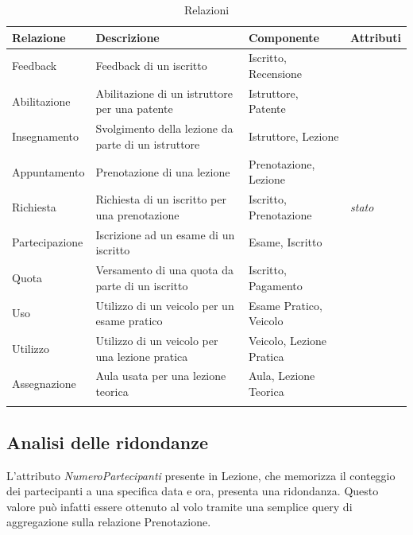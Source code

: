 \documentclass[10pt,twoside]{article}
\begin{document}
{    \begin{longtable}[H]{|>{\centering\arraybackslash}p{3cm}|
                            >{\centering\arraybackslash}p{3cm}|
                            >{\centering\arraybackslash}p{4.85cm}|
                            >{\centering\arraybackslash}p{3cm}|}
            \hline
            \rowcolor{lightgray!40}
            \textbf{Relazione} & \textbf{Descrizione} & \textbf{Componente} & \textbf{Attributi} \\
            \hline
            \rowcolor{white!40}
            Feedback & Feedback di un iscritto & Iscritto, Recensione & \\
            \hline
            \rowcolor{white!40}
            Abilitazione & Abilitazione di un istruttore per una patente & Istruttore, Patente & \\
            \hline
            \rowcolor{white!40}
            Insegnamento & Svolgimento della lezione da parte di un istruttore & Istruttore, Lezione & \\
            \hline
            \rowcolor{white!40}
            Appuntamento & Prenotazione di una lezione & Prenotazione, Lezione & \\
            \hline
            \rowcolor{white!40}
            Richiesta & Richiesta di un iscritto per una prenotazione & Iscritto, Prenotazione & \textit{stato}\\
            \hline
            \rowcolor{white!40}
            Partecipazione & Iscrizione ad un esame di un iscritto & Esame, Iscritto & \\
            \hline
            \rowcolor{white!40}
            Quota & Versamento di una quota da parte di un iscritto & Iscritto, Pagamento & \\
            \hline
            \rowcolor{white!40}
            Uso & Utilizzo di un veicolo per un esame pratico & Esame Pratico, Veicolo& \\
            \hline
            \rowcolor{white!40}
            Utilizzo & Utilizzo di un veicolo per una lezione pratica & Veicolo, Lezione Pratica & \\
            \hline
            \rowcolor{white!40}
            Assegnazione & Aula usata per una lezione teorica & Aula, Lezione Teorica & \\
            \hline
        \caption{Relazioni}
        \label{fig:tabellaRelazioni}
    \end{longtable}

    \subsection{Analisi delle ridondanze}{
        L’attributo \textit{NumeroPartecipanti} presente in Lezione, che memorizza il conteggio dei partecipanti a una specifica data e ora, presenta una ridondanza. Questo valore può infatti essere ottenuto al volo tramite una semplice query di aggregazione sulla relazione Prenotazione.

}}
\end{document}
